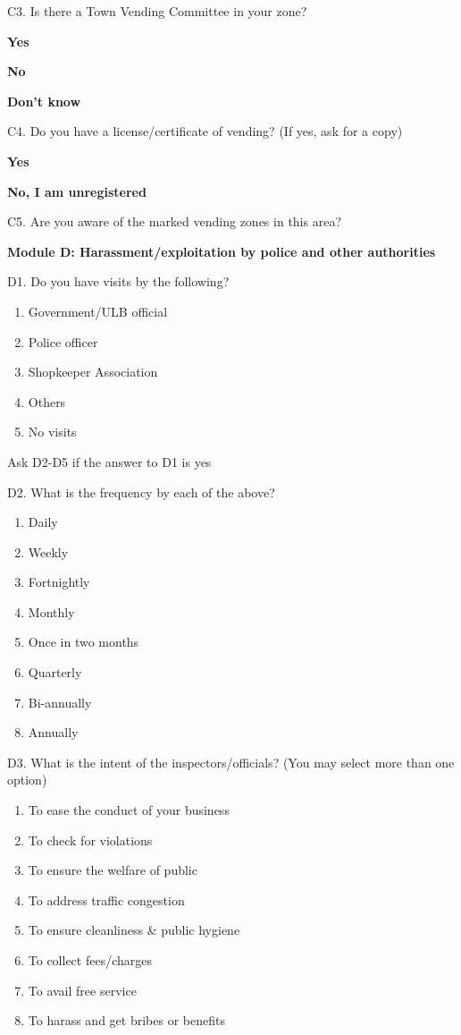 \documentclass[a4paper, 12pt, twoside]{article}
\begin{document}
{{\begin{mdframed}[backgroundcolor=gray!20]
C3. Is there a Town Vending Committee in your zone?

\textbf{Yes}

\textbf{No}

\textbf{Don’t know}

C4. Do you have a license/certificate of vending? (If yes, ask for a copy)

\textbf{Yes}

\textbf{No, I am unregistered}

C5. Are you aware of the marked vending zones in this area?

\textbf{Module D: Harassment/exploitation by police and other authorities}

D1. Do you have visits by the following?
\begin{enumerate}[nosep]
\item Government/ULB official
\item Police officer
\item Shopkeeper Association
\item Others
\item No visits
\end{enumerate}

Ask D2-D5 if the answer to D1 is yes

D2. What is the frequency by each of the above?
\begin{enumerate}[nosep]
\item Daily
\item Weekly
\item Fortnightly
\item Monthly
\item Once in two months
\item Quarterly
\item Bi-annually
\item Annually
\end{enumerate}

D3. What is the intent of the inspectors/officials? (You may select more than one option)
\begin{enumerate}[nosep]
\item To ease the conduct of your business
\item To check for violations
\item To ensure the welfare of public
\item To address traffic congestion
\item To ensure cleanliness \& public hygiene
\item To collect fees/charges
\item To avail free service
\item To harass and get bribes or benefits
\end{enumerate}


\end{mdframed}}}
\end{document}

